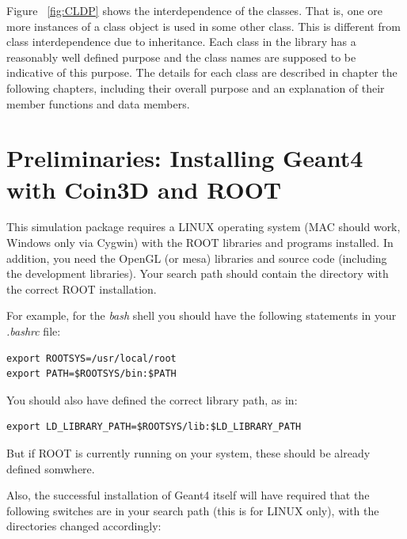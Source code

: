 Figure ~\ref{fig:CLDP} shows the interdependence of the classes. That
is, one ore more instances of a class object is used in some other
class.  This is different from class interdependence due to
inheritance. Each class in the library has a reasonably well defined
purpose and the class names are supposed to be indicative of this
purpose. The details for each class are described in chapter the
following chapters, including their overall purpose and an explanation
of their member functions and data members.


\section{Preliminaries: Installing Geant4 with Coin3D and ROOT} \label{CHP_I-SCN_II}

This simulation package requires a LINUX operating system (MAC should
work, Windows only via Cygwin) with the ROOT libraries and programs
installed. In addition, you need the OpenGL (or mesa) libraries and
source code (including the development libraries). Your search path
should contain the directory with the correct ROOT installation.

For example, for the {\em bash} shell you should have the following
statements in your {\em .bashrc} file:
\begin{verbatim}
export ROOTSYS=/usr/local/root
export PATH=$ROOTSYS/bin:$PATH
\end{verbatim}
You should also have defined the correct library path, as in:
\begin{verbatim}
export LD_LIBRARY_PATH=$ROOTSYS/lib:$LD_LIBRARY_PATH 
\end{verbatim}
But if ROOT is currently running on your system, these should be already
defined somwhere.

Also, the successful installation of Geant4 itself will have required
that the following switches are in your search path (this is for LINUX only),
with the directories changed accordingly:

